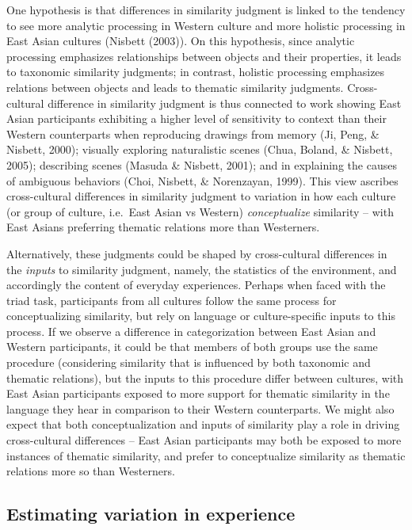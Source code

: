 \documentclass[10pt, letterpaper]{article}
\begin{document}
One hypothesis is that differences in similarity judgment is linked to
the tendency to see more analytic processing in Western culture and more
holistic processing in East Asian cultures (Nisbett (2003)). On this
hypothesis, since analytic processing emphasizes relationships between
objects and their properties, it leads to taxonomic similarity
judgments; in contrast, holistic processing emphasizes relations between
objects and leads to thematic similarity judgments. Cross-cultural
difference in similarity judgment is thus connected to work showing East
Asian participants exhibiting a higher level of sensitivity to context
than their Western counterparts when reproducing drawings from memory
(Ji, Peng, \& Nisbett, 2000); visually exploring naturalistic scenes
(Chua, Boland, \& Nisbett, 2005); describing scenes (Masuda \& Nisbett,
2001); and in explaining the causes of ambiguous behaviors (Choi,
Nisbett, \& Norenzayan, 1999). This view ascribes cross-cultural
differences in similarity judgment to variation in how each culture (or
group of culture, i.e.~East Asian vs Western) \emph{conceptualize}
similarity -- with East Asians preferring thematic relations more than
Westerners.

Alternatively, these judgments could be shaped by cross-cultural
differences in the \emph{inputs} to similarity judgment, namely, the
statistics of the environment, and accordingly the content of everyday
experiences. Perhaps when faced with the triad task, participants from
all cultures follow the same process for conceptualizing similarity, but
rely on language or culture-specific inputs to this process. If we
observe a difference in categorization between East Asian and Western
participants, it could be that members of both groups use the same
procedure (considering similarity that is influenced by both taxonomic
and thematic relations), but the inputs to this procedure differ between
cultures, with East Asian participants exposed to more support for
thematic similarity in the language they hear in comparison to their
Western counterparts. We might also expect that both conceptualization
and inputs of similarity play a role in driving cross-cultural
differences -- East Asian participants may both be exposed to more
instances of thematic similarity, and prefer to conceptualize similarity
as thematic relations more so than Westerners.

\hypertarget{estimating-variation-in-experience}{%
\subsection{Estimating variation in
experience}\label{estimating-variation-in-experience}}
\end{document}
